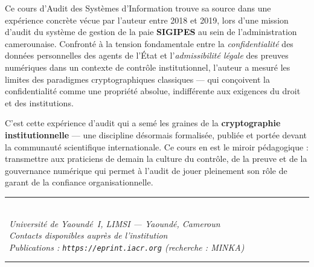 \begin{tcolorbox}[
    enhanced,
    breakable,
    colback=CouleurAlerte,
    colframe=CouleurBordAlerte,
    fonttitle=\bfseries\color{white},
    title={\ding{96}\quad Genèse de ce Cours : D'une Expérience de Terrain à une Discipline},
    attach boxed title to top left={yshift=-2mm, xshift=4mm},
    boxed title style={colback=CouleurBordAlerte, rounded corners},
    arc=3pt, boxrule=0.8pt,
    left=8pt, right=8pt, top=10pt, bottom=8pt
]

Ce cours d'Audit des Systèmes d'Information trouve sa source dans une expérience concrète vécue par l'auteur entre 2018 et 2019, lors d'une mission d'audit du système de gestion de la paie \textbf{SIGIPES} au sein de l'administration camerounaise. Confronté à la tension fondamentale entre la \textit{confidentialité} des données personnelles des agents de l'État et l'\textit{admissibilité légale} des preuves numériques dans un contexte de contrôle institutionnel, l'auteur a mesuré les limites des paradigmes cryptographiques classiques — qui conçoivent la confidentialité comme une propriété absolue, indifférente aux exigences du droit et des institutions.

\medskip

C'est cette expérience d'audit qui a semé les graines de la \textbf{cryptographie institutionnelle} — une discipline désormais formalisée, publiée et portée devant la communauté scientifique internationale. Ce cours en est le miroir pédagogique : transmettre aux praticiens de demain la culture du contrôle, de la preuve et de la gouvernance numérique qui permet à l'audit de jouer pleinement son rôle de garant de la confiance organisationnelle.

\end{tcolorbox}

\vspace{1.5ex}


\begin{center}
{\color{CouleurAccent}\rule{0.5\linewidth}{0.6pt}}\\[0.8ex]
{\small\color{CouleurPrimaire}
    ~\textit{Université de Yaoundé~I, LIMSI — Yaoundé, Cameroun}\\[0.3ex]
    ~\textit{Contacts disponibles auprès de l'institution}\\[0.3ex]
    ~\textit{Publications : \texttt{https://eprint.iacr.org} (recherche : MINKA)}
}\\[0.8ex]
{\color{CouleurAccent}\rule{0.5\linewidth}{0.6pt}}
\end{center}
